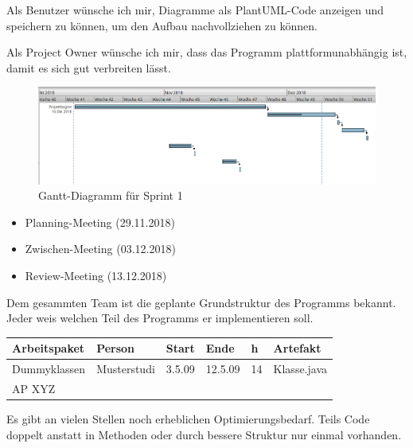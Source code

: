 Als Benutzer wünsche ich mir, Diagramme als PlantUML-Code anzeigen und speichern zu können, um den Aufbau nachvollziehen zu können.
\nsecend

Als Project Owner wünsche ich mir, dass das Programm plattformunabhängig ist, damit es sich gut verbreiten lässt.
\nsecend
\nsecend %

\begin{figure}[hbtp]
\centering
\includegraphics[width=\textwidth]{Bilder/gantt}
\caption{Gantt-Diagramm für Sprint 1}
\end{figure}
\nsecend

\begin{itemize}
\item Planning-Meeting (29.11.2018)
\item Zwischen-Meeting (03.12.2018)
\item Review-Meeting (13.12.2018)
\end{itemize}
\nsecend

Dem gesammten Team ist die geplante Grundstruktur des Programms bekannt. Jeder weis welchen Teil des Programms er implementieren soll.
\nsecend

\begin{longtable}{|p{4cm}|l|l|l|l|l|}
        \hline
        Arbeitspaket & Person & Start & Ende & h & Artefakt\\
        \hline
        Dummyklassen & Musterstudi & 3.5.09 & 12.5.09 & 14 & Klasse.java\\ \hline
        AP XYZ &  &  &  & & \\ \hline
\end{longtable}     
\nsecend

Es gibt an vielen Stellen noch erheblichen Optimierungsbedarf. Teils Code doppelt anstatt in Methoden oder durch bessere Struktur nur einmal vorhanden.
\nsecend

